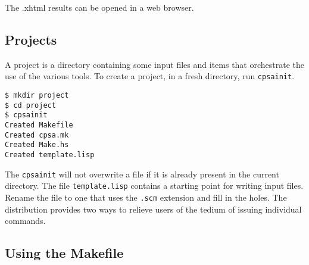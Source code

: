 The .xhtml results can be opened in a web browser.

\subsection{{\cpsa} Projects}\label{sec:cpsainit}

A {\cpsa} project is a directory containing some {\cpsa} input files
and items that orchestrate the use of the various {\cpsa} tools.  To
create a project, in a fresh directory, run \texttt{cpsainit}.

\begin{verbatim}
$ mkdir project
$ cd project
$ cpsainit
Created Makefile
Created cpsa.mk
Created Make.hs
Created template.lisp
\end{verbatim}

The \texttt{cpsainit} will not overwrite a file if it is already
present in the current directory.  The file \texttt{template.lisp}
contains a starting point for writing {\cpsa} input files.  Rename the
file to one that uses the \texttt{.scm} extension and fill in the
holes.  The distribution provides two ways to relieve users of the
tedium of issuing individual commands.

\subsection{Using the {\cpsa} Makefile}







